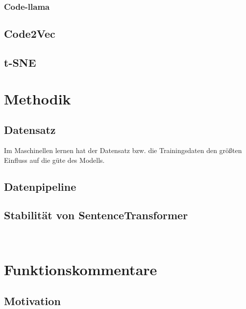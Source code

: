 \documentclass[12pt,letterpaper,ngerman]{article}
\begin{document}
\subsubsection{Code-llama}
\subsection{Code2Vec}
\subsection{t-SNE}
\section{Methodik}
\subsection{Datensatz}
Im Maschinellen lernen hat der Datensatz bzw. die Trainingsdaten den
größten Einfluss auf die güte des Modells.
\subsection{Datenpipeline}
\subsection{Stabilität von SentenceTransformer}

\
\section{Funktionskommentare}
\subsection{Motivation}
\end{document}

